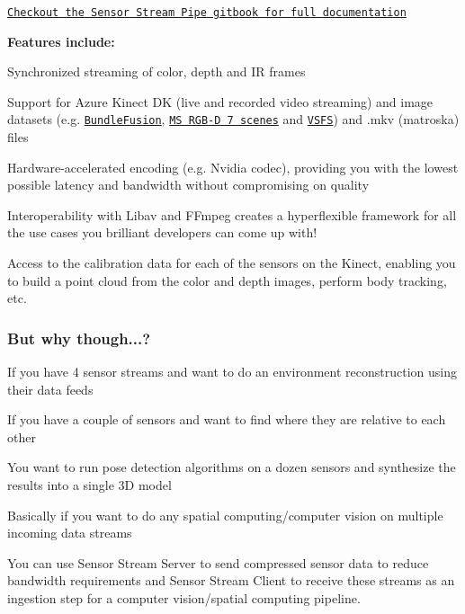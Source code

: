 \href{https://moetsi.gitbook.io/sensor-stream-pipe/}{\tt Checkout the Sensor Stream Pipe gitbook for full documentation}

{\bfseries Features include\+:}


\begin{DoxyItemize}
\item Synchronized streaming of color, depth and IR frames
\item Support for Azure Kinect DK (live and recorded video streaming) and image datasets (e.\+g. \href{https://graphics.stanford.edu/projects/bundlefusion/}{\tt Bundle\+Fusion}, \href{https://www.microsoft.com/en-us/research/project/rgb-d-dataset-7-scenes/}{\tt MS R\+G\+B-\/D 7 scenes} and \href{http://graphics.stanford.edu/projects/vsfs/}{\tt V\+S\+FS}) and .mkv (matroska) files
\item Hardware-\/accelerated encoding (e.\+g. Nvidia codec), providing you with the lowest possible latency and bandwidth without compromising on quality
\item Interoperability with Libav and F\+Fmpeg creates a hyperflexible framework for all the use cases you brilliant developers can come up with!
\item Access to the calibration data for each of the sensors on the Kinect, enabling you to build a point cloud from the color and depth images, perform body tracking, etc.
\end{DoxyItemize}

\subsubsection*{But why though...?}


\begin{DoxyItemize}
\item If you have 4 sensor streams and want to do an environment reconstruction using their data feeds
\item If you have a couple of sensors and want to find where they are relative to each other
\item You want to run pose detection algorithms on a dozen sensors and synthesize the results into a single 3D model
\item Basically if you want to do any spatial computing/computer vision on multiple incoming data streams
\end{DoxyItemize}

You can use Sensor Stream Server to send compressed sensor data to reduce bandwidth requirements and Sensor Stream Client to receive these streams as an ingestion step for a computer vision/spatial computing pipeline.

